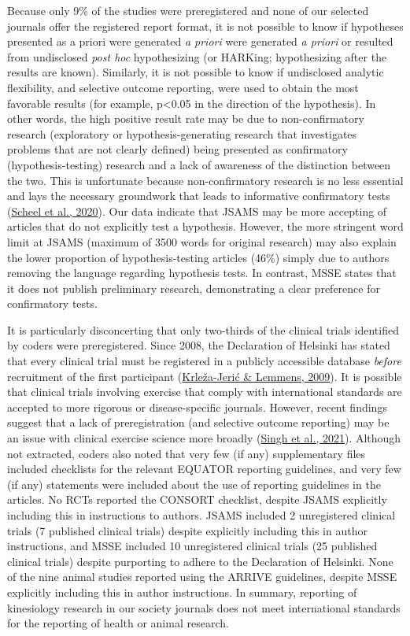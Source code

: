 \documentclass[]{cik}%
\begin{document}
Because only 9\% of the studies were preregistered and none of our
selected journals offer the registered report format, it is not possible
to know if hypotheses presented as a priori were generated \emph{a
priori} were generated \emph{a priori} or resulted from undisclosed
\emph{post hoc} hypothesizing (or HARKing; hypothesizing after the
results are known). Similarly, it is not possible to know if undisclosed
analytic flexibility, and selective outcome reporting, were used to
obtain the most favorable results (for example, p\textless0.05 in the
direction of the hypothesis). In other words, the high positive result
rate may be due to non-confirmatory research (exploratory or
hypothesis-generating research that investigates problems that are not
clearly defined) being presented as confirmatory (hypothesis-testing)
research and a lack of awareness of the distinction between the two.
This is unfortunate because non-confirmatory research is no less
essential and lays the necessary groundwork that leads to informative
confirmatory tests (\protect\hyperlink{ref-Scheel2020}{Scheel et al.,
2020}). Our data indicate that JSAMS may be more accepting of articles
that do not explicitly test a hypothesis. However, the more stringent
word limit at JSAMS (maximum of 3500 words for original research) may
also explain the lower proportion of hypothesis-testing articles (46\%)
simply due to authors removing the language regarding hypothesis tests.
In contrast, MSSE states that it does not publish preliminary research,
demonstrating a clear preference for confirmatory tests.

It is particularly disconcerting that only two-thirds of the clinical
trials identified by coders were preregistered. Since 2008, the
Declaration of Helsinki has stated that every clinical trial must be
registered in a publicly accessible database \emph{before} recruitment
of the first participant
(\protect\hyperlink{ref-KrleaJeri2009}{Krleža-Jerić \& Lemmens, 2009}).
It is possible that clinical trials involving exercise that comply with
international standards are accepted to more rigorous or
disease-specific journals. However, recent findings suggest that a lack
of preregistration (and selective outcome reporting) may be an issue
with clinical exercise science more broadly
(\protect\hyperlink{ref-Singh2021}{Singh et al., 2021}). Although not
extracted, coders also noted that very few (if any) supplementary files
included checklists for the relevant EQUATOR reporting guidelines, and
very few (if any) statements were included about the use of reporting
guidelines in the articles. No RCTs reported the CONSORT checklist,
despite JSAMS explicitly including this in instructions to authors.
JSAMS included 2 unregistered clinical trials (7 published clinical
trials) despite explicitly including this in author instructions, and
MSSE included 10 unregistered clinical trials (25 published clinical
trials) despite purporting to adhere to the Declaration of Helsinki.
None of the nine animal studies reported using the ARRIVE guidelines,
despite MSSE explicitly including this in author instructions. In
summary, reporting of kinesiology research in our society journals does
not meet international standards for the reporting of health or animal
research.
\end{document}
